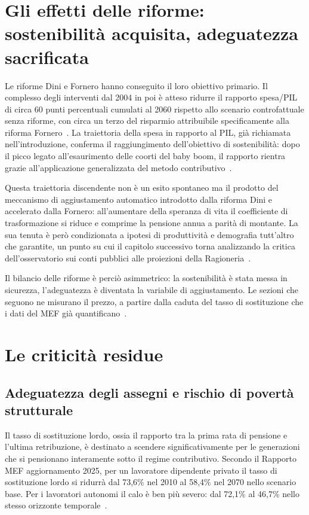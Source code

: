 \section{Gli effetti delle riforme: sostenibilità acquisita, adeguatezza sacrificata}

Le riforme Dini e Fornero hanno conseguito il loro obiettivo primario. Il complesso degli interventi dal 2004 in poi è atteso ridurre il rapporto spesa/PIL di circa 60 punti percentuali cumulati al 2060 rispetto allo scenario controfattuale senza riforme, con circa un terzo del risparmio attribuibile specificamente alla riforma Fornero~\cite{MEF_RGS2025_NdA, BosiGuerra2022}. La traiettoria della spesa in rapporto al PIL, già richiamata nell'introduzione, conferma il raggiungimento dell'obiettivo di sostenibilità: dopo il picco legato all'esaurimento delle coorti del baby boom, il rapporto rientra grazie all'applicazione generalizzata del metodo contributivo~\cite{MEF_RGS2025}.

Questa traiettoria discendente non è un esito spontaneo ma il prodotto del meccanismo di aggiustamento automatico introdotto dalla riforma Dini e accelerato dalla Fornero: all'aumentare della speranza di vita il coefficiente di trasformazione si riduce e comprime la pensione annua a parità di montante. La sua tenuta è però condizionata a ipotesi di produttività e demografia tutt'altro che garantite, un punto su cui il capitolo successivo torna analizzando la critica dell'osservatorio sui conti pubblici alle proiezioni della Ragioneria~\cite{OCPI2026}.

Il bilancio delle riforme è perciò asimmetrico: la sostenibilità è stata messa in sicurezza, l'adeguatezza è diventata la variabile di aggiustamento. Le sezioni che seguono ne misurano il prezzo, a partire dalla caduta del tasso di sostituzione che i dati del MEF già quantificano~\cite{MEF_RGS2025}.

\section{Le criticità residue}

\subsection{Adeguatezza degli assegni e rischio di povertà strutturale}

Il tasso di sostituzione lordo, ossia il rapporto tra la prima rata di pensione e l'ultima retribuzione, è destinato a scendere significativamente per le generazioni che si pensionano interamente sotto il regime contributivo. Secondo il Rapporto MEF aggiornamento 2025, per un lavoratore dipendente privato il tasso di sostituzione lordo si ridurrà dal 73,6\% nel 2010 al 58,4\% nel 2070 nello scenario base. Per i lavoratori autonomi il calo è ben più severo: dal 72,1\% al 46,7\% nello stesso orizzonte temporale~\cite{MEF_RGS2025}.

